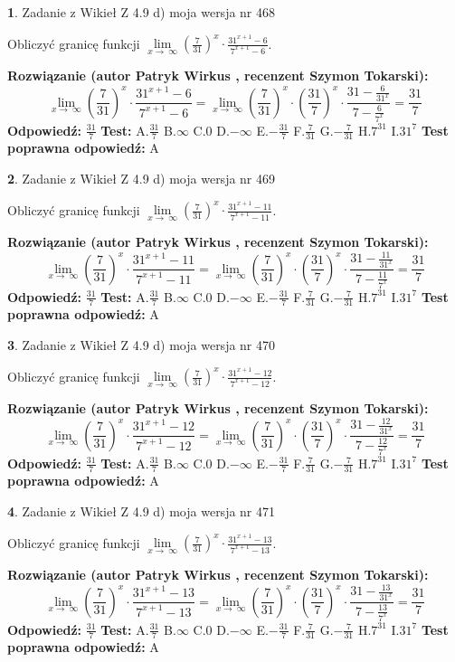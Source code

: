 \documentclass[12pt, a4paper]{article}
\theoremstyle{definition} %
\newtheorem{zad}{}
\newcommand{\zadStart}[1]{\begin{zad}#1\newline}
\newcommand{\zadStop}{\end{zad}}
\newcommand{\rozwStart}[2]{\noindent \textbf{Rozwiązanie (autor #1 , recenzent #2): }\newline}
\newcommand{\rozwStop}{\newline}
\newcommand{\odpStart}{\noindent \textbf{Odpowiedź:}\newline}
\newcommand{\odpStop}{\newline}
\newcommand{\testStart}{\noindent \textbf{Test:}\newline}
\newcommand{\testStop}{\newline}
\newcommand{\kluczStart}{\noindent \textbf{Test poprawna odpowiedź:}\newline}
\newcommand{\kluczStop}{\newline}
\begin{document}
\zadStart{Zadanie z Wikieł Z 4.9 d) moja wersja nr 468}


Obliczyć granicę funkcji  $\lim\limits_{x\to\ \infty}(\frac{7}{31})^{x}\cdot\frac{31^{x+1}-6}{7^{x+1}-6}$.
\zadStop
\rozwStart{Patryk Wirkus}{Szymon Tokarski}
$$\lim\limits_{x\to\ \infty}(\frac{7}{31})^{x}\cdot\frac{31^{x+1}-6}{7^{x+1}-6}=\lim\limits_{x\to\ \infty}(\frac{7}{31})^{x}\cdot(\frac{31}{7})^{x} \cdot \frac{31-\frac{6}{31^{x}}}{7-\frac{6}{7^{x}}} = \frac{31}{7}$$
\rozwStop
\odpStart
$\frac{31}{7}$
\odpStop
\testStart
A.$\frac{31}{7}$ B.$\infty$ C.$0$ D.$-\infty$ E.$-\frac{31}{7}$
F.$\frac{7}{31}$ G.$-\frac{7}{31}$
H.$7^{31}$
I.$31^{7}$
\testStop
\kluczStart
A
\kluczStop



\zadStart{Zadanie z Wikieł Z 4.9 d) moja wersja nr 469}


Obliczyć granicę funkcji  $\lim\limits_{x\to\ \infty}(\frac{7}{31})^{x}\cdot\frac{31^{x+1}-11}{7^{x+1}-11}$.
\zadStop
\rozwStart{Patryk Wirkus}{Szymon Tokarski}
$$\lim\limits_{x\to\ \infty}(\frac{7}{31})^{x}\cdot\frac{31^{x+1}-11}{7^{x+1}-11}=\lim\limits_{x\to\ \infty}(\frac{7}{31})^{x}\cdot(\frac{31}{7})^{x} \cdot \frac{31-\frac{11}{31^{x}}}{7-\frac{11}{7^{x}}} = \frac{31}{7}$$
\rozwStop
\odpStart
$\frac{31}{7}$
\odpStop
\testStart
A.$\frac{31}{7}$ B.$\infty$ C.$0$ D.$-\infty$ E.$-\frac{31}{7}$
F.$\frac{7}{31}$ G.$-\frac{7}{31}$
H.$7^{31}$
I.$31^{7}$
\testStop
\kluczStart
A
\kluczStop



\zadStart{Zadanie z Wikieł Z 4.9 d) moja wersja nr 470}


Obliczyć granicę funkcji  $\lim\limits_{x\to\ \infty}(\frac{7}{31})^{x}\cdot\frac{31^{x+1}-12}{7^{x+1}-12}$.
\zadStop
\rozwStart{Patryk Wirkus}{Szymon Tokarski}
$$\lim\limits_{x\to\ \infty}(\frac{7}{31})^{x}\cdot\frac{31^{x+1}-12}{7^{x+1}-12}=\lim\limits_{x\to\ \infty}(\frac{7}{31})^{x}\cdot(\frac{31}{7})^{x} \cdot \frac{31-\frac{12}{31^{x}}}{7-\frac{12}{7^{x}}} = \frac{31}{7}$$
\rozwStop
\odpStart
$\frac{31}{7}$
\odpStop
\testStart
A.$\frac{31}{7}$ B.$\infty$ C.$0$ D.$-\infty$ E.$-\frac{31}{7}$
F.$\frac{7}{31}$ G.$-\frac{7}{31}$
H.$7^{31}$
I.$31^{7}$
\testStop
\kluczStart
A
\kluczStop



\zadStart{Zadanie z Wikieł Z 4.9 d) moja wersja nr 471}


Obliczyć granicę funkcji  $\lim\limits_{x\to\ \infty}(\frac{7}{31})^{x}\cdot\frac{31^{x+1}-13}{7^{x+1}-13}$.
\zadStop
\rozwStart{Patryk Wirkus}{Szymon Tokarski}
$$\lim\limits_{x\to\ \infty}(\frac{7}{31})^{x}\cdot\frac{31^{x+1}-13}{7^{x+1}-13}=\lim\limits_{x\to\ \infty}(\frac{7}{31})^{x}\cdot(\frac{31}{7})^{x} \cdot \frac{31-\frac{13}{31^{x}}}{7-\frac{13}{7^{x}}} = \frac{31}{7}$$
\rozwStop
\odpStart
$\frac{31}{7}$
\odpStop
\testStart
A.$\frac{31}{7}$ B.$\infty$ C.$0$ D.$-\infty$ E.$-\frac{31}{7}$
F.$\frac{7}{31}$ G.$-\frac{7}{31}$
H.$7^{31}$
I.$31^{7}$
\testStop
\kluczStart
A
\kluczStop
\end{document}

